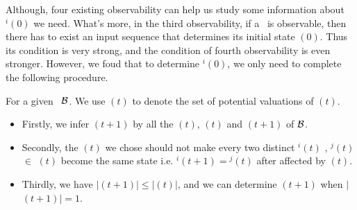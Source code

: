 
\begin{comment}
\ly{In the four existing observability, we can not determine the initial state of \BCNs\ by the first and second observability.} Although we can determine the initail state of \BCNs\ by the third and fourth observability, the requirements for \BCNs\ to determine the initail state are difficult to meet. Thus, we consider that whether we can determine the initial state of some \BCNs\ which can not be determined by the third and fourth observability.
\end{comment}
Although, four existing observability can help us study some information about \State$^{i}(0)$ we need. %
What's more, in the third observability, if a \BCN\ is observable, then there has to exist an input sequence that determines its initial state \State$(0)$. Thus its condition is very strong, and the condition of fourth observability is even stronger. However, we foud that to determine \State$^{i}(0)$, we only need to complete the following procedure.

For a given \BCN\  ${\mathcal{B}}$.  We use \Ustate$(t)$ to denote the set of potential valuations of \State$(t)$.
\begin{itemize}
	\item  Firstly, we infer \Ustate$(t+1)$ by all the \Input$(t)$, \Ustate$(t)$ and \Output$(t+1)$ of ${\mathcal{B}}$.
	\item Secondly, the \Input$(t)$ we chose should not make every two distinct \State$^{i}(t)$ , \State$^{j}(t)$$\in$ \Ustate$(t)$ become the same state i.e. \State$^{i}(t+1)=$\State$^{j}(t)$ after affected by \Input$(t)$.  
	\item Thirdly, we have $|$\Ustate$(t+1)$$|\le|$\Ustate$(t)$$|$, and we can determine \State$(t+1)$ when $|$\Ustate$(t+1)$$|=1$.
\end{itemize}

